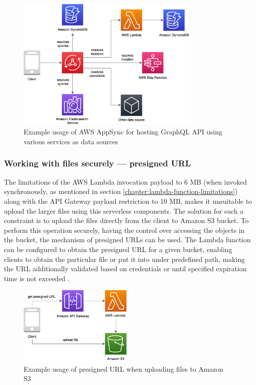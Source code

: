 \begin{figure}[H]
   \centering
   \includegraphics[width=0.8\textwidth]{assets/04-serverless-for-web-apps/graphql.png}
   \caption{Example usage of AWS AppSync for hosting GraphQL API using various services as data sources}
   \label{fig:pattern-graphql-api}
\end{figure}

\subsubsection{Working with files securely --- presigned URL} \label{chapter:client-presigned-urls}

The limitations of the AWS Lambda invocation payload to 6 MB (when invoked synchronously, as mentioned in section \ref{chapter:lambda-function-limitations}) along with the API Gateway payload restriction to 10 MB, makes it unsuitable to upload the larger files using this serverless components.
The solution for such a constraint is to upload the files directly from the client to Amazon S3 bucket.
To perform this operation securely, having the control over accessing the objects in the bucket, the mechanism of presigned URLs can be used.
The Lambda function can be configured to obtain the presigned URL for a given bucket, enabling clients to obtain the particular file or put it into under predefined path, making the URL additionally validated based on credentials or until specified expiration time is not exceeded \cite{ServerlessAtScaleDesignPatternsAndOptimizations}.

\begin{figure}[H]
   \centering
   \includegraphics[width=0.5\textwidth]{assets/04-serverless-for-web-apps/presignedURL.png}
   \caption{Example usage of presigned URL when uploading files to Amazon S3}
   \label{fig:pattern-presigned-url}
\end{figure}

